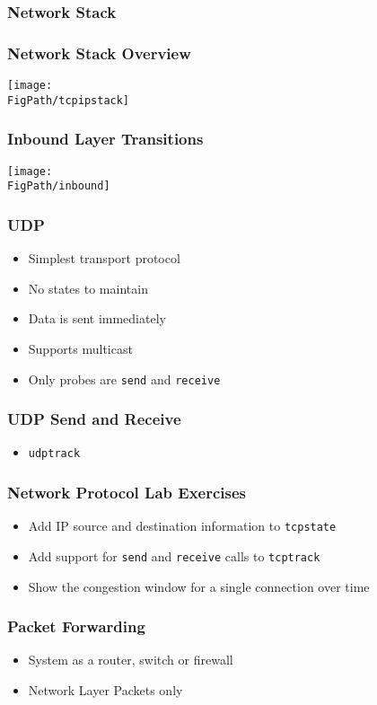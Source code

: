 \documentclass[pdftex]{beamer}
\begin{document}
\begin{frame}
  \frametitle{Network Stack}
\end{frame}

\begin{frame}
  \frametitle{Network Stack Overview}
\centering
\texttt{[image: \\FigPath/tcpipstack]}
\end{frame}

\begin{frame}
\centering
  \frametitle{Inbound Layer Transitions}
\texttt{[image: \\FigPath/inbound]}
\end{frame}

\begin{frame}[fragile]
  \frametitle{UDP}
  \begin{itemize}
  \item Simplest transport protocol
  \item No states to maintain
  \item Data is sent immediately
  \item Supports multicast
  \item Only probes are \verb+send+ and \verb+receive+
  \end{itemize}
\end{frame}

\begin{frame}[fragile]
  \frametitle{UDP Send and Receive}
  \begin{itemize}
  \item \verb|udptrack|
  \end{itemize}
\end{frame}

\begin{frame}[fragile]
  \frametitle{Network Protocol Lab Exercises}
  \begin{itemize}
  \item Add IP source and destination information to \verb+tcpstate+
  \item Add support for \verb+send+ and \verb+receive+ calls to \verb+tcptrack+
  \item Show the congestion window for a single connection over time
  \end{itemize}
\end{frame}

\begin{frame}
  \frametitle{Packet Forwarding}
  \begin{itemize}
  \item System as a router, switch or firewall
  \item Network Layer Packets only
  \end{itemize}
\end{frame}
\end{document}
